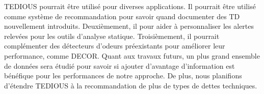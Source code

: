 \ac{TEDIOUS} pourrait \^{e}tre utilis\'{e} pour diverses applications. Il pourrait \^{e}tre utilis\'{e} comme syst\`{e}me de recommandation pour savoir quand documenter des \ac{TD} nouvellement introduits. Deuxi\`{e}mement, il pour aider \`{a} personnaliser les alertes relev\'{e}es pour les outils d'analyse statique. Troisi\`{e}mement, il pourrait compl\'{e}menter des d\'{e}tecteurs d'odeurs pr\'{e}existants pour am\'{e}liorer leur performance, comme \ac{DECOR}. Quant aux travaux futurs, un plus grand ensemble de donn\'{e}es sera \'{e}tudi\'{e} pour savoir si ajouter d'avantage d'information est b\'{e}n\'{e}fique pour les performances de notre approche. De plus, nous planifions d'\'{e}tendre \ac{TEDIOUS} \`{a} la recommandation de plus de types de dettes techniques.























